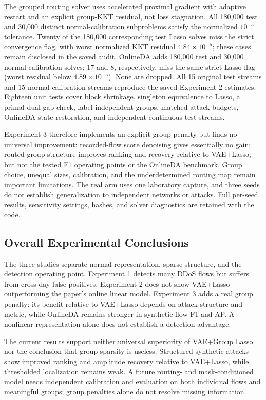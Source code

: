 \documentclass[12pt]{article}
\begin{document}
The grouped routing solver uses accelerated proximal gradient with adaptive
restart and an explicit group-KKT residual, not loss stagnation. All 180,000
test and 30,000 distinct normal-calibration subproblems satisfy the normalized
$10^{-5}$ tolerance. Twenty of the 180,000 corresponding test Lasso solves
miss the strict convergence flag, with worst normalized KKT residual
$4.84\times10^{-5}$; these cases remain disclosed in the saved audit.
OnlineDA adds 180,000 test and 30,000 normal-calibration solves; 17 and 8,
respectively, miss the same strict Lasso flag (worst residual below
$4.89\times10^{-5}$). None are dropped. All 15 original test streams and 15
normal-calibration streams reproduce the saved Experiment-2 estimates.
Eighteen unit tests cover block shrinkage, singleton equivalence to Lasso,
a primal-dual gap check, label-independent groups, matched attack budgets,
OnlineDA state restoration, and independent continuous test streams.

Experiment 3 therefore implements an explicit group penalty but finds no
universal improvement: recorded-flow score denoising gives essentially no gain;
routed group structure improves ranking and recovery relative to VAE+Lasso,
but not the tested F1 operating points or the OnlineDA benchmark. Group choice, unequal sizes,
calibration, and the underdetermined routing map remain important limitations.
The real arm uses one laboratory capture, and three seeds do not establish
generalization to independent networks or attacks. Full per-seed results,
sensitivity settings, hashes, and solver diagnostics are retained with the code.

\subsection{Overall Experimental Conclusions}

The three studies separate normal representation, sparse structure, and the
detection operating point. Experiment 1 detects many DDoS flows but suffers
from cross-day false positives. Experiment 2 does not show VAE+Lasso outperforming
the paper's online linear model. Experiment 3 adds a real group penalty: its
benefit relative to VAE+Lasso depends on attack structure and metric, while
OnlineDA remains stronger in synthetic flow F1 and AP. A nonlinear
representation alone does not establish a detection advantage.

The current results support neither universal superiority of VAE+Group Lasso
nor the conclusion that group sparsity is useless. Structured synthetic attacks
show improved ranking and amplitude recovery relative to VAE+Lasso, while thresholded
localization remains weak. A future routing- and mask-conditioned model needs
independent calibration and evaluation on both individual flows and meaningful
groups; group penalties alone do not resolve missing information.

\clearpage


\end{document}
